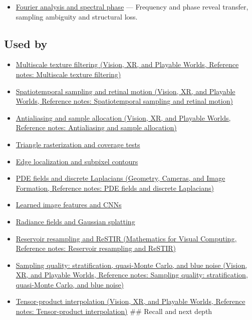 \hypertarget{appendix-6a7869dd79a6-prerequisites}{}

\begin{itemize}
\tightlist
\item
  \hyperref[appendix-b60686ba06a1]{Fourier analysis and spectral phase} --- Frequency and phase reveal transfer, sampling ambiguity and structural loss.
\end{itemize}

\subsection{Used by}\label{appendix-6a7869dd79a6-used-by}

\hypertarget{appendix-6a7869dd79a6-used-by}{}

\begin{itemize}
\item
  \href{../07-Vision-XR-and-Playable-Worlds/main.pdf\#nameddest=appendix-b677a85ba76f}{Multiscale texture filtering (Vision, XR, and Playable Worlds, Reference notes: Multiscale texture filtering)}
\item
  \href{../07-Vision-XR-and-Playable-Worlds/main.pdf\#nameddest=appendix-70895739febb}{Spatiotemporal sampling and retinal motion (Vision, XR, and Playable Worlds, Reference notes: Spatiotemporal sampling and retinal motion)}
\item
  \href{../07-Vision-XR-and-Playable-Worlds/main.pdf\#nameddest=appendix-4192b2bdd21e}{Antialiasing and sample allocation (Vision, XR, and Playable Worlds, Reference notes: Antialiasing and sample allocation)}
\item
  \hyperref[appendix-ed3f9bc298fe]{Triangle rasterization and coverage tests}
\item
  \hyperref[appendix-36022286b03e]{Edge localization and subpixel contours}
\item
  \href{../03-Geometry-Cameras-and-Image-Formation/main.pdf\#nameddest=appendix-1988d465c119}{PDE fields and discrete Laplacians (Geometry, Cameras, and Image Formation, Reference notes: PDE fields and discrete Laplacians)}
\item
  \hyperref[appendix-47c51ea026fb]{Learned image features and CNNs}
\item
  \hyperref[appendix-c5b332e400e7]{Radiance fields and Gaussian splatting}
\item
  \href{../02-Mathematics-for-Visual-Computing/main.pdf\#nameddest=appendix-68be451b78b1}{Reservoir resampling and ReSTIR (Mathematics for Visual Computing, Reference notes: Reservoir resampling and ReSTIR)}
\item
  \href{../07-Vision-XR-and-Playable-Worlds/main.pdf\#nameddest=appendix-9f693ffd82bc}{Sampling quality: stratification, quasi-Monte Carlo, and blue noise (Vision, XR, and Playable Worlds, Reference notes: Sampling quality: stratification, quasi-Monte Carlo, and blue noise)}
\item
  \href{../07-Vision-XR-and-Playable-Worlds/main.pdf\#nameddest=appendix-0a09b6dfdc86}{Tensor-product interpolation (Vision, XR, and Playable Worlds, Reference notes: Tensor-product interpolation)} \#\# Recall and next depth
\end{itemize}

